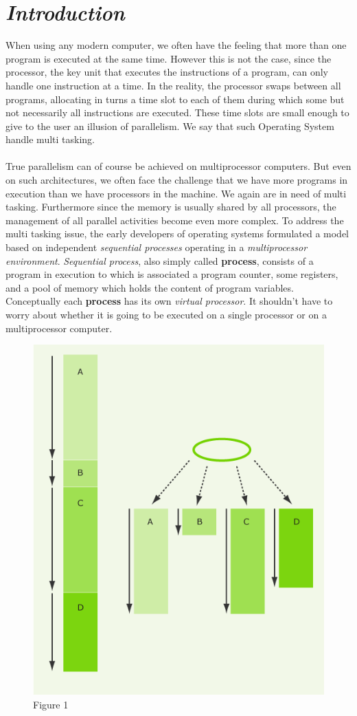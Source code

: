 \documentclass[11pt,a4paper]{scrreprt}
\begin{document}
\section{\textit{Introduction}}
When using any modern computer, we often have the feeling that more than one program is executed at the same time. However this is not the case, since the processor, the key unit that executes the instructions of a program, can only handle one instruction at a time. In the reality, the processor swaps between all programs, allocating in turns a time slot to each of them during which some but not necessarily all instructions are executed. These time slots are small enough to give to the user an illusion of parallelism. We say that such Operating System handle multi tasking. \\\\
True parallelism can of course be achieved on multiprocessor computers. But even on such architectures, we often face the challenge that we have more programs in execution than we have processors in the machine. We again are in need of multi tasking. Furthermore since the memory is usually shared by all processors, the management of all parallel activities become even more complex.
\newpage
To address the multi tasking issue, the early developers of operating systems formulated a model based on independent \textit{sequential processes} operating in a \textit{multiprocessor environment}. \textit{Sequential process}, also simply called \textbf{process}, consists of a program in execution to which is associated a program counter, some registers, and a pool of memory which holds the content of program variables. Conceptually each \textbf{process} has its own \textit{virtual processor}. It shouldn’t have to worry about whether it is going to be executed on a single processor or on a multiprocessor computer.
\begin{figure}[!ht]
\centering
\includegraphics[width=0.7\linewidth]{img/process1.png}
\caption{Figure 1}
\label{fig:figure1}
\end{figure} 
\end{document}
